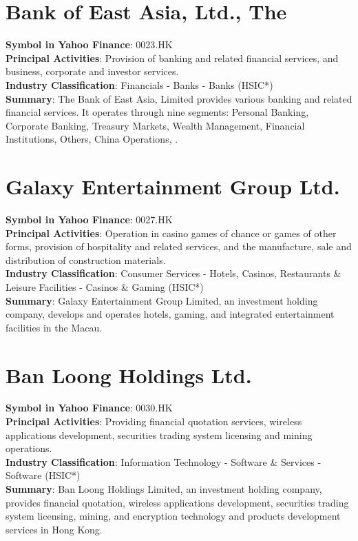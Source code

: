 \section{Bank of East Asia, Ltd., The}
\textbf{Symbol in Yahoo Finance}: 0023.HK\\
\textbf{Principal Activities}: Provision of banking and related financial services, and business, corporate and investor services.\\
\textbf{Industry Classification}: Financials - Banks - Banks (HSIC*)\\
\textbf{Summary}: The Bank of East Asia, Limited provides various banking and related financial services. It operates through nine segments: Personal Banking, Corporate Banking, Treasury Markets, Wealth Management, Financial Institutions, Others, China Operations, .


\section{Galaxy Entertainment Group Ltd.}
\textbf{Symbol in Yahoo Finance}: 0027.HK\\
\textbf{Principal Activities}: Operation in casino games of chance or games of other forms, provision of hospitality and related services, and the manufacture, sale and distribution of construction materials.\\
\textbf{Industry Classification}: Consumer Services - Hotels, Casinos, Restaurants \& Leisure Facilities - Casinos \& Gaming (HSIC*)\\
\textbf{Summary}: Galaxy Entertainment Group Limited, an investment holding company, develops and operates hotels, gaming, and integrated entertainment facilities in the Macau.


\section{Ban Loong Holdings Ltd.}
\textbf{Symbol in Yahoo Finance}: 0030.HK\\
\textbf{Principal Activities}: Providing financial quotation services, wireless applications development, securities trading system licensing and mining operations.\\
\textbf{Industry Classification}: Information Technology - Software \& Services - Software (HSIC*)\\
\textbf{Summary}: Ban Loong Holdings Limited, an investment holding company, provides financial quotation, wireless applications development, securities trading system licensing, mining, and encryption technology and products development services in Hong Kong.


